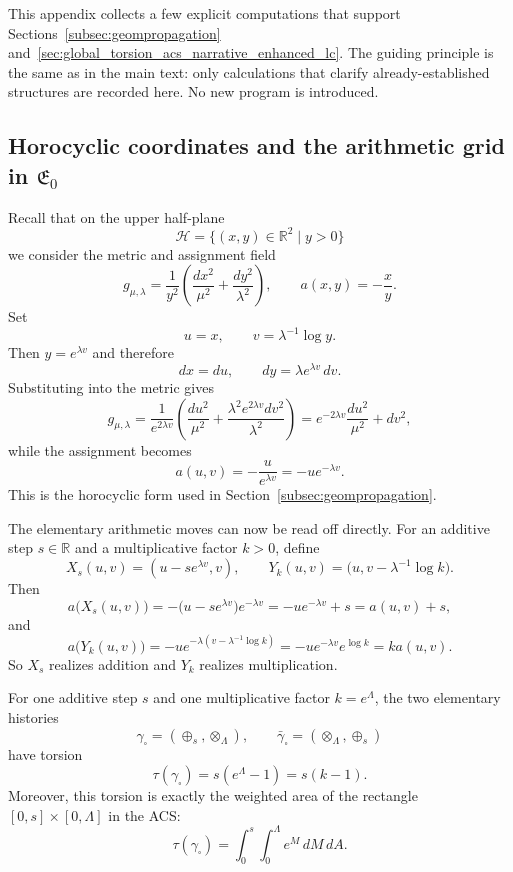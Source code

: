This appendix collects a few explicit computations that support Sections~\ref{subsec:geompropagation} and~\ref{sec:global_torsion_acs_narrative_enhanced_lc}. The guiding principle is the same as in the main text: only calculations that clarify already-established structures are recorded here. No new program is introduced.

\subsection{Horocyclic coordinates and the arithmetic grid in \texorpdfstring{$\mathfrak{E}_0$}{E0}}
\label{appC:horocyclic-grid}

Recall that on the upper half-plane
\[
\mathcal H=\{(x,y)\in\mathbb R^2\mid y>0\}
\]
we consider the metric and assignment field
\[
 g_{\mu,\lambda}=\frac1{y^2}\left(\frac{dx^2}{\mu^2}+\frac{dy^2}{\lambda^2}\right),
 \qquad
 a(x,y)=-\frac{x}{y}.
\]
Set
\[
 u=x,
 \qquad
 v=\lambda^{-1}\log y.
\]
Then $y=e^{\lambda v}$ and therefore
\[
 dx=du,
 \qquad
 dy=\lambda e^{\lambda v}\,dv.
\]
Substituting into the metric gives
\[
 g_{\mu,\lambda}
 =\frac{1}{e^{2\lambda v}}\left(\frac{du^2}{\mu^2}+\frac{\lambda^2e^{2\lambda v}dv^2}{\lambda^2}\right)
 =e^{-2\lambda v}\frac{du^2}{\mu^2}+dv^2,
\]
while the assignment becomes
\[
 a(u,v)=-\frac{u}{e^{\lambda v}}=-u e^{-\lambda v}.
\]
This is the horocyclic form used in Section~\ref{subsec:geompropagation}.

The elementary arithmetic moves can now be read off directly.
For an additive step $s\in\mathbb R$ and a multiplicative factor $k>0$, define
\[
 X_s(u,v)=(u-se^{\lambda v},v),
 \qquad
 Y_k(u,v)=\bigl(u,v-\lambda^{-1}\log k\bigr).
\]
Then
\[
 a\bigl(X_s(u,v)\bigr)
 =-\bigl(u-se^{\lambda v}\bigr)e^{-\lambda v}
 =-ue^{-\lambda v}+s
 =a(u,v)+s,
\]
and
\[
 a\bigl(Y_k(u,v)\bigr)
 =-u e^{-\lambda(v-\lambda^{-1}\log k)}
 =-u e^{-\lambda v}e^{\log k}
 =k a(u,v).
\]
So $X_s$ realizes addition and $Y_k$ realizes multiplication.

\begin{proposition}
\label{prop:appC-one-cell-torsion}
For one additive step $s$ and one multiplicative factor $k=e^{\Lambda}$, the two elementary histories
\[
\gamma_{\square}=(\oplus_s,\otimes_{\Lambda}),
\qquad
\bar\gamma_{\square}=(\otimes_{\Lambda},\oplus_s)
\]
have torsion
\[
\tau(\gamma_{\square})=s(e^{\Lambda}-1)=s(k-1).
\]
Moreover, this torsion is exactly the weighted area of the rectangle
$[0,s]\times[0,\Lambda]$ in the ACS:
\[
\tau(\gamma_{\square})
 =\int_0^s\int_0^{\Lambda} e^M\,dM\,dA.
\]
\end{proposition}

